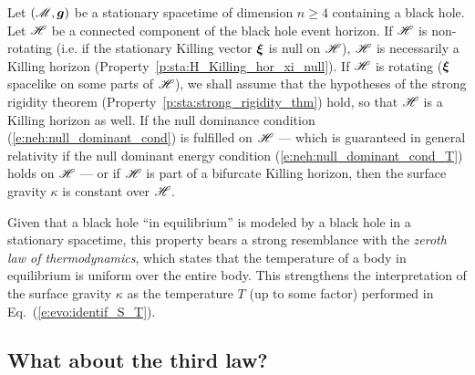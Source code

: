 \begin{prop}
\label{p:evo:zeroth_law}
Let $(\mathscr{M},\bm{g})$ be a stationary spacetime of dimension $n\geq 4$
containing a black hole.
Let $\mathscr{H}$ be a connected component of the black hole event horizon.
If $\mathscr{H}$ is non-rotating (i.e. if the stationary Killing vector $\bm{\xi}$ is null
on $\mathscr{H}$), $\mathscr{H}$ is necessarily a Killing horizon (Property~\ref{p:sta:H_Killing_hor_xi_null}).
If $\mathscr{H}$ is rotating
($\bm{\xi}$ spacelike on some parts of $\mathscr{H}$),
we shall assume that the hypotheses of the strong rigidity theorem
(Property~\ref{p:sta:strong_rigidity_thm}) hold, so that $\mathscr{H}$ is a Killing horizon as well.
If the null dominance condition (\ref{e:neh:null_dominant_cond})
is fulfilled on $\mathscr{H}$  --- which is guaranteed in general relativity
if the null dominant energy condition (\ref{e:neh:null_dominant_cond_T}) holds on $\mathscr{H}$ ---
or if $\mathscr{H}$ is part of a bifurcate Killing horizon,
then the surface gravity $\kappa$ is constant over $\mathscr{H}$.
\end{prop}

Given that a black hole ``in equilibrium'' is modeled by a black hole in
a stationary spacetime,
this property bears a strong resemblance with
the \emph{zeroth law of thermodynamics}, which states that the temperature of a body in equilibrium
is uniform over the entire body.
This strengthens the interpretation of the surface gravity
$\kappa$ as the temperature $T$ (up to some factor) performed in
Eq.~(\ref{e:evo:identif_S_T}).


\subsection{What about the third law?}

